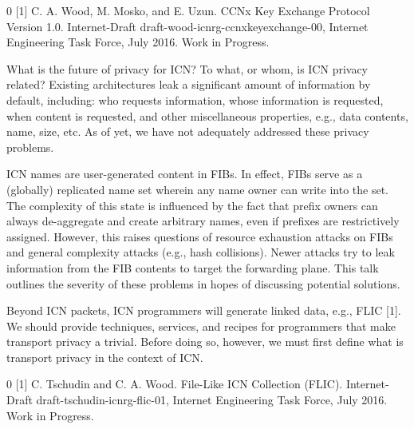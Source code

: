\documentclass[a4paper,UKenglish]{dagrep}
\begin{document}
\begin{thebibliography}{0}
[1] C. A. Wood, M. Mosko, and E. Uzun. CCNx Key Exchange Protocol Version 1.0. Internet-Draft draft-wood-icnrg-ccnxkeyexchange-00, Internet Engineering Task Force, July 2016. Work in Progress.
\end{thebibliography}

\license

What is the future of privacy for ICN? To what, or whom, is ICN privacy related? Existing architectures leak a significant amount of information by default, including: who requests information, whose information is requested, when content is requested, and other miscellaneous properties, e.g., data contents, name, size, etc. As of yet, we have not adequately addressed these privacy problems.

\license

ICN names are user-generated content in FIBs. In effect, FIBs serve as a (globally) replicated name set wherein any name owner can write into the set. The complexity of this state is influenced by the fact that prefix owners can always de-aggregate and create arbitrary names, even if prefixes are restrictively assigned. However, this raises questions of resource exhaustion attacks on FIBs and general complexity attacks (e.g., hash collisions). Newer attacks try to leak information from the FIB contents to target the forwarding plane. This talk outlines the severity of these problems in hopes of discussing potential solutions.

\license

Beyond ICN packets, ICN programmers will generate linked data, e.g., FLIC [1]. We should provide techniques, services, and recipes for programmers that make transport privacy a trivial. Before doing so, however, we must first define what is transport privacy in the context of ICN. 

\begin{thebibliography}{0}
[1] C. Tschudin and C. A. Wood. File-Like ICN Collection (FLIC). Internet-Draft draft-tschudin-icnrg-flic-01, Internet Engineering Task Force, July 2016. Work in Progress.
\end{thebibliography}
\end{document}
